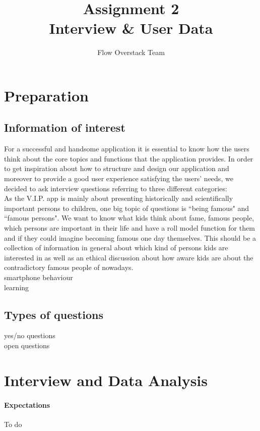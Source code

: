 \documentclass[12pt]{scrartcl}
\title{Assignment 2\\ Interview \& User Data}
\author{Flow Overstack Team}
\date{}
\begin{document}
\maketitle


\section*{Preparation}
	\subsection*{Information of interest}
		For a successful and handsome application it is essential to know how the users think about the core topics and functions that the application provides. In order to get inspiration about how to structure and design our application and moreover to provide a good user experience satisfying the users' needs, we decided to ask interview questions referring to three different categories:\\
		
		As the V.I.P. app is mainly about presenting historically and scientifically important persons to children, one big topic of questions is ``being famous" and ``famous persons". We want to know what kids think about fame, famous people, which persons are important in their life and have a roll model function for them and if they could imagine becoming famous one day themselves. This should be a collection of information in general about which kind of persons kids are interested in as well as an ethical discussion about how aware kids are about the contradictory famous people of nowadays.\\
		
		smartphone behaviour\\
		
		learning\\
		
	\subsection*{Types of questions}
		yes/no questions\\
		
		open questions


\section*{Interview and Data Analysis}
	\paragraph{Expectations}
		To do
		
\end{document}
